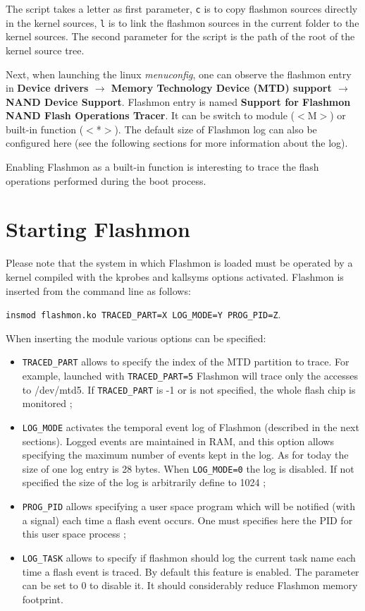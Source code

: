 \documentclass[11pt]{article}
\begin{document}
	The script takes a letter as first parameter, \verb+c+ is to copy flashmon sources directly in the kernel sources, \verb+l+ is to link the flashmon sources in the current folder to the kernel sources.
	The second parameter for the script is the path of the root of the kernel source tree.
	
	Next, when launching the linux \emph{menuconfig}, one can observe the flashmon entry in \textbf{Device drivers $\rightarrow$ Memory Technology Device (MTD) support $\rightarrow$ NAND Device Support}. Flashmon entry is named \textbf{Support for Flashmon NAND Flash Operations Tracer}. It can be switch to module ($<$M$>$) or built-in function ($<$*$>$). The default size of Flashmon log can also be configured here (see the following sections for more information about the log).
	
	Enabling Flashmon as a built-in function is interesting to trace the flash operations performed during the boot process.

\section{Starting Flashmon}

Please note that the system in which Flashmon is loaded must be operated by a kernel compiled with the kprobes and kallsyms options activated. Flashmon is inserted from the command line as follows: 

\verb+insmod flashmon.ko TRACED_PART=X LOG_MODE=Y PROG_PID=Z+.

When inserting the module various options can be specified:

\begin{itemize}
	\item \verb+TRACED_PART+ allows to specify the index of the MTD partition to trace. For example, launched with \verb+TRACED_PART=5+ Flashmon will trace only the accesses to /dev/mtd5. If \verb+TRACED_PART+ is -1 or is not specified, the whole flash chip is monitored ;
	\item \verb+LOG_MODE+ activates the temporal event log of Flashmon (described in the next sections). Logged events are maintained in RAM, and this option allows specifying the maximum number of events kept in the log. As for today the size of one log entry is 28 bytes. When \verb+LOG_MODE=0+ the log is disabled. If not specified the size of the log is arbitrarily define to 1024 ;
	\item \verb+PROG_PID+ allows specifying a user space program which will be notified (with a signal) each time a flash event occurs. One must specifies here the PID for this user space process ;
	\item \verb+LOG_TASK+ allows to specify if flashmon should log the current task name each time a flash event is traced. By default this feature is enabled. The parameter can be set to 0 to disable it. It should considerably reduce Flashmon memory footprint.
\end{itemize}
\end{document}
